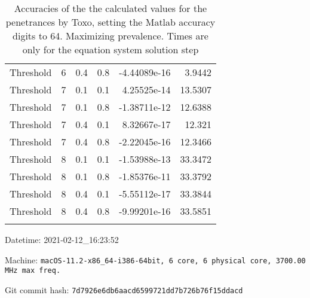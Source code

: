 \documentclass{article}
\begin{document}
\begin{longtable}[H]{lrrrrr}
 Threshold      &       6 &   0.4 &            0.8 &     -4.44089e-16 &          3.9442 \\
 Threshold      &       7 &   0.1 &            0.1 &      4.25525e-14 &         13.5307 \\
 Threshold      &       7 &   0.1 &            0.8 &     -1.38711e-12 &         12.6388 \\
 Threshold      &       7 &   0.4 &            0.1 &      8.32667e-17 &         12.321  \\
 Threshold      &       7 &   0.4 &            0.8 &     -2.22045e-16 &         12.3466 \\
 Threshold      &       8 &   0.1 &            0.1 &     -1.53988e-13 &         33.3472 \\
 Threshold      &       8 &   0.1 &            0.8 &     -1.85376e-11 &         33.3792 \\
 Threshold      &       8 &   0.4 &            0.1 &     -5.55112e-17 &         33.3844 \\
 Threshold      &       8 &   0.4 &            0.8 &     -9.99201e-16 &         33.5851 \\
\hline

\caption{Accuracies of the the calculated values for the penetrances by Toxo,
setting the Matlab accuracy digits to 64. Maximizing prevalence. Times are only
for the equation system solution step
}
\end{longtable}
Datetime: 2021-02-12\_16:23:52

Machine: \texttt{macOS-11.2-x86\_64-i386-64bit, 6 core, 6 physical core, 3700.00 MHz max freq.}

Git commit hash: \texttt{7d7926e6db6aacd6599721dd7b726b76f15ddacd}
\end{document}

